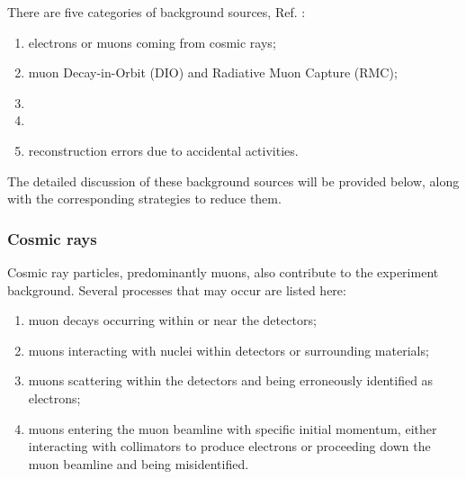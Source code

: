 There are five categories of background 
sources, Ref. \cite{bartoszek2015mu2e}:
\begin{enumerate}
\item electrons or muons coming from cosmic rays;
\item {}

  muon Decay-in-Orbit (DIO) and Radiative Muon Capture (RMC);
\item
  \item
    
\item
  {\red reconstruction errors due to accidental activities.}
 
\end{enumerate}
The detailed discussion of these background sources will be provided below, along with the 
corresponding strategies to reduce  
them. 
\subsubsection{Cosmic rays}
Cosmic ray particles, predominantly muons, also contribute to the experiment 
background. Several processes that may occur are listed here:
\begin{enumerate}
    \item muon decays occurring within or near the detectors;
    \item muons interacting with nuclei within detectors or surrounding materials;
    \item muons scattering within the detectors and being erroneously identified as electrons;
    \item
      {\red muons entering the muon beamline with specific initial momentum, either 
    interacting with collimators to produce electrons or proceeding down the muon 
    beamline and being misidentified.}
    
\end{enumerate}

